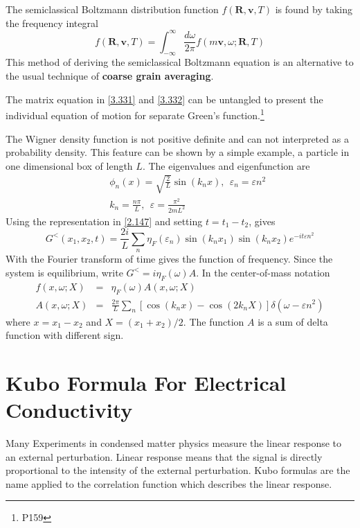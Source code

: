 The semiclassical Boltzmann distribution function $f(\mathbf{R},\mathbf{v},T)$ is found by taking the frequency integral
\begin{equation}
    f(\mathbf{R},\mathbf{v},T) = \int_{-\infty}^\infty \frac{d \omega}{2\pi} f(m\mathbf{v},\omega;\mathbf{R},T)     \label{3.340}
\end{equation}
This method of deriving the semiclassical Boltzmann equation is an alternative to the usual technique of \textbf{coarse grain averaging}.

The matrix equation in \eqref{3.331} and \eqref{3.332} can be untangled to present the individual equation of motion for separate Green's function.\footnote{P159}

The Wigner density function is not positive definite and can not interpreted as a probability density.
This feature can be shown by a simple example, a particle in one dimensional box of length $L$.
The eigenvalues and eigenfunction are
\begin{eqnarray}
    &&\phi_n(x) = \sqrt{ \frac{2}{L} } \sin(k_n x), ~ ~ \varepsilon_n = \varepsilon n^2 \label{3.343} \\
    && k_n = \frac{n\pi}{L} , ~ ~ \varepsilon = \frac{\pi^2}{2mL^2}  \label{3.344}
\end{eqnarray}
Using the representation in \eqref{2.147} and setting $t = t_1 -t_2$, gives
\begin{equation}
    G^<(x_1,x_2,t) = \frac{2i}{L} \sum_n \eta_F(\varepsilon_n) \sin(k_n x_1) \sin(k_nx_2) e^{-it \varepsilon n^2}   \label{3.345}
\end{equation}
With the Fourier transform of time gives the function of frequency.
Since the system is equilibrium, write $G^< = i\eta_F(\omega)A$.
In the center-of-mass notation
\begin{eqnarray}
    f(x,\omega;X) &=& \eta_F(\omega) A(x,\omega;X)  \label{3.346} \\
    A(x,\omega;X) &=& \frac{2\pi}{L} \sum_n \left[ \cos(k_n x) - \cos(2k_n X) \right] \delta(\omega-\varepsilon n^2)    \label{3.347}
\end{eqnarray}
where $x= x_1-x_2$ and $X= (x_1+ x_2)/2$.
The function $A$ is a sum of delta function with different sign.

\section{Kubo Formula For Electrical Conductivity} \label{s3.8}
Many Experiments in condensed matter physics measure the linear response to an external perturbation.
Linear response means that the signal is directly proportional to the intensity of the external perturbation.
Kubo formulas are the name applied to the correlation function which describes the linear response.

